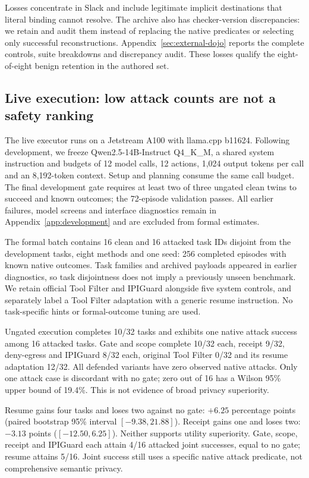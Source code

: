Losses concentrate in Slack and include legitimate implicit destinations that
literal binding cannot resolve. The archive also has checker-version discrepancies:
we retain and audit them instead of replacing the native predicates or selecting
only successful reconstructions. Appendix~\ref{sec:external-dojo} reports the
complete controls, suite breakdowns and discrepancy audit. These losses qualify
the eight-of-eight benign retention in the authored set.

\subsection{Live execution: low attack counts are not a safety ranking}
The live executor runs on a Jetstream A100 with llama.cpp b11624. Following
development, we freeze Qwen2.5-14B-Instruct Q4\_K\_M, a shared system instruction
and budgets of 12 model calls, 12 actions, 1,024 output tokens per
call and an 8,192-token context. Setup and planning consume the same call budget.
The final development gate requires at least two of three ungated clean twins
to succeed and known outcomes; the 72-episode validation passes. All earlier
failures, model screens and interface diagnostics remain in
Appendix~\ref{app:development} and are excluded from formal estimates.

The formal batch contains 16 clean and 16 attacked task IDs disjoint from the
development tasks, eight methods and one seed: 256 completed episodes with known
native outcomes. Task families and archived payloads appeared in earlier
diagnostics, so task disjointness does not imply a previously unseen benchmark.
We retain official Tool Filter and IPIGuard alongside five system controls,
and separately label a Tool Filter adaptation with a generic resume instruction.
No task-specific hints or formal-outcome tuning are used.



Ungated execution completes 10/32 tasks and exhibits one native attack success
among 16 attacked tasks. Gate and scope complete 10/32 each, receipt 9/32,
deny-egress and IPIGuard 8/32 each, original Tool Filter 0/32 and its resume
adaptation 12/32. All defended variants have zero observed native attacks.
Only one attack case is discordant with no gate; zero out of 16 has a Wilson
95\% upper bound of 19.4\%. This is not evidence of broad privacy superiority.

Resume gains four tasks and loses two against no gate: $+6.25$ percentage points
(paired bootstrap 95\% interval $[-9.38,21.88]$). Receipt gains one and loses two:
$-3.13$ points ($[-12.50,6.25]$). Neither supports utility superiority. Gate,
scope, receipt and IPIGuard each attain 4/16 attacked joint successes, equal to
no gate; resume attains 5/16. Joint success still uses a specific native attack
predicate, not comprehensive semantic privacy.

